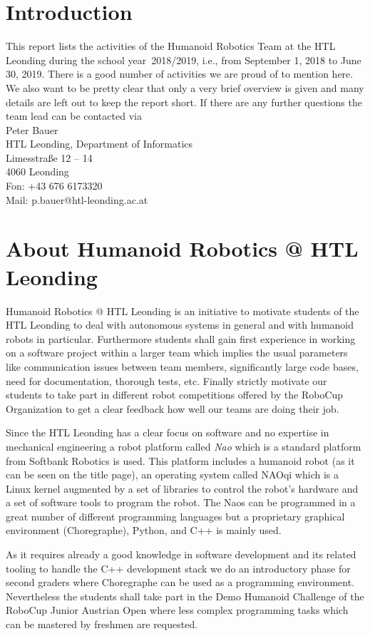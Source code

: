 \documentclass[11pt]{article}
\begin{document}
\section{Introduction}
This report lists the activities of the Humanoid Robotics Team at the HTL Leonding during the school year~2018/2019, i.e., from September 1, 2018 to June 30, 2019. There is a good number of activities we are proud of to mention here. We also want to be pretty clear that only  a very brief overview is given and many details are left out to keep the report short. If there are any further questions the team lead can be contacted via \\[1em]
Peter Bauer\\
HTL Leonding, Department of Informatics\\
Limesstraße 12 -- 14\\
4060 Leonding\\
Fon: +43 676 6173320\\
Mail: p.bauer@htl-leonding.ac.at

\section{About Humanoid Robotics @ HTL Leonding}
Humanoid Robotics @ HTL Leonding is an initiative to motivate students of the HTL Leonding to deal with autonomous systems in general and with humanoid robots in particular. Furthermore students shall gain first experience in working on a software project within a larger team which implies the usual parameters like communication issues between team members, significantly large code bases, need for documentation, thorough tests, etc. Finally strictly motivate our students to take part in different robot competitions offered by the RoboCup Organization to get a clear feedback how well our teams are doing their job.

Since the HTL Leonding has a clear focus on software and no expertise in mechanical engineering a robot platform called {\em Nao} which is a standard platform from Softbank Robotics is used. This platform includes a humanoid robot (as it can be seen on the title page), an operating system called NAOqi which is a Linux kernel augmented by a set of libraries to control the robot's hardware and a set of software tools to program the robot. The Naos can be programmed in a great number of different programming languages but a proprietary graphical environment (Choregraphe), Python, and  C++ is mainly used.

As it requires already a good knowledge in software development and its related tooling to handle the C++ development stack we do an introductory phase for second graders where Choregraphe can be used as a programming environment. Nevertheless the students shall take part in the Demo Humanoid Challenge of the RoboCup Junior Austrian Open where less complex programming tasks which can be mastered by freshmen are requested.
\end{document}
